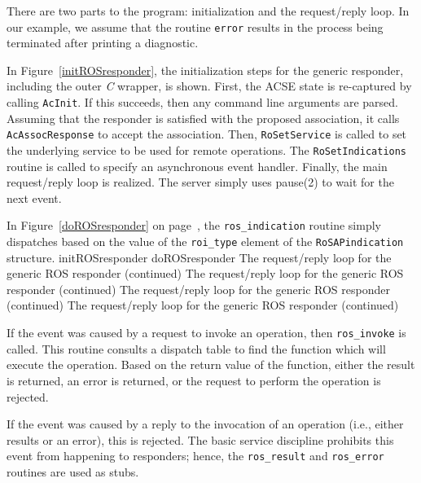 There are two parts to the program:
initialization and the request/reply loop.
In our example,
we assume that the routine \verb"error" results in the process being
terminated after printing a diagnostic.

In Figure~\ref{initROSresponder},
the initialization steps for the generic responder,
including the outer {\em C\/} wrapper,
is shown.
First, the ACSE state is re-captured by calling \verb"AcInit".
If this succeeds,
then any command line arguments
are parsed.
Assuming that the responder is satisfied with the proposed association,
it calls \verb"AcAssocResponse" to accept the association.
Then,
\verb"RoSetService" is called
to set the underlying service to be used for remote operations.
The
\verb"RoSetIndications" routine is called
to specify an asynchronous event handler.
Finally,
the main request/reply loop is realized.
The server simply uses \man pause(2) to wait for the next event.

In Figure~\ref{doROSresponder} on page~\pageref{doROSresponder},
the \verb"ros_indication" routine simply dispatches based on the value of the
\verb"roi_type" element of the \verb"RoSAPindication" structure.
{\let\small=\scriptsize			%
\clearpage
{}%
	{initROSresponder}
\clearpage
{}%
	{doROSresponder}
\clearpage
{}%
	{The request/reply loop for the generic ROS responder (continued)}%
	\empty
\clearpage
{}%
	{The request/reply loop for the generic ROS responder (continued)}%
	\empty
\clearpage
{}%
	{The request/reply loop for the generic ROS responder (continued)}%
	\empty
\clearpage
{}%
	{The request/reply loop for the generic ROS responder (continued)}%
	\empty}

If the event was caused by a request to invoke an operation,
then \verb"ros_invoke" is called.
This routine consults a dispatch table to find the function which will
execute the operation.
Based on the return value of the function,
either the result is returned,
an error is returned,
or the request to perform the operation is rejected.

If the event was caused by a reply to the invocation of an operation
(i.e., either  results or an error),
this is rejected.
The basic service discipline prohibits this event from happening to
responders;
hence, the \verb"ros_result" and \verb"ros_error" routines are used as stubs.

